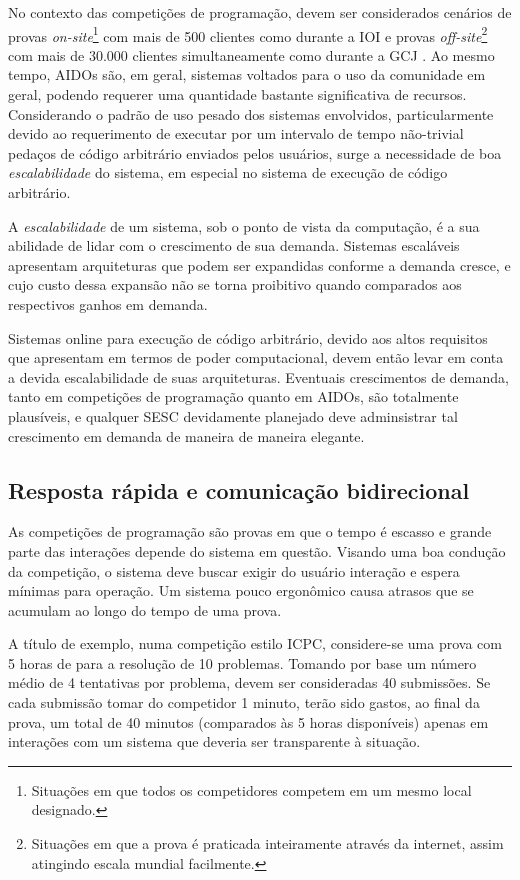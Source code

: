 \documentclass[ruledheader, 12pt]{abnt}
\begin{document}
No contexto das competições de programação, devem ser considerados cenários de provas \emph{on-site}\footnote{Situações em que todos os competidores competem em um mesmo local designado.} com mais de 500 clientes como durante a IOI \cite{ioi-nl1-2007} e provas \emph{off-site}\footnote{Situações em que a prova é praticada inteiramente através da internet, assim atingindo escala mundial facilmente.} com mais de 30.000 clientes simultaneamente como durante a GCJ \cite{googlecodejamhistory}. Ao mesmo tempo, AIDOs são, em geral, sistemas voltados para o uso da comunidade em geral, podendo requerer uma quantidade bastante significativa de recursos. Considerando o padrão de uso pesado dos sistemas envolvidos, particularmente devido ao requerimento de executar por um intervalo de tempo não-trivial pedaços de código arbitrário enviados pelos usuários, surge a necessidade de boa \emph{escalabilidade} do sistema, em especial no sistema de execução de código arbitrário.

A \emph{escalabilidade} de um sistema, sob o ponto de vista da computação, é a sua abilidade de lidar com o crescimento de sua demanda. Sistemas escaláveis apresentam arquiteturas que podem ser expandidas conforme a demanda cresce, e cujo custo dessa expansão não se torna proibitivo quando comparados aos respectivos ganhos em demanda.

Sistemas online para execução de código arbitrário, devido aos altos requisitos que apresentam em termos de poder computacional, devem então levar em conta a devida escalabilidade de suas arquiteturas. Eventuais crescimentos de demanda, tanto em competições de programação quanto em AIDOs, são totalmente plausíveis, e qualquer SESC devidamente planejado deve adminsistrar tal crescimento em demanda de maneira de maneira elegante.

\subsection{Resposta rápida e comunicação bidirecional}

As competições de programação são provas em que o tempo é escasso e grande parte das interações depende do sistema em questão. Visando uma boa condução da competição, o sistema deve buscar exigir do usuário interação e espera mínimas para operação. Um sistema pouco ergonômico causa atrasos que se acumulam ao longo do tempo de uma prova.

A título de exemplo, numa competição estilo ICPC, considere-se uma prova com 5 horas de para a resolução de 10 problemas. Tomando por base um número médio de 4 tentativas por problema, devem ser consideradas 40 submissões. Se cada submissão tomar do competidor 1 minuto, terão sido gastos, ao final da prova, um total de 40 minutos (comparados às 5 horas disponíveis) apenas em interações com um sistema que deveria ser transparente à situação.
\end{document}
